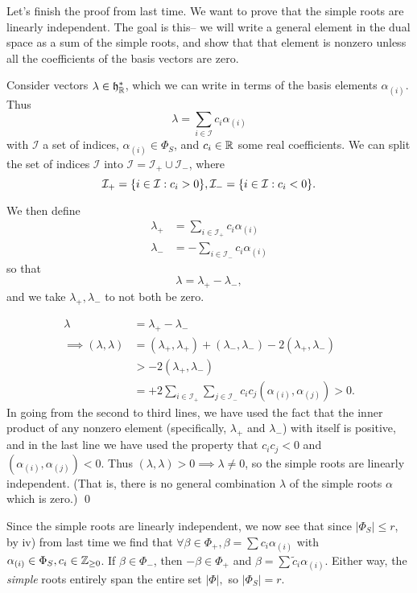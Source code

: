 Let's finish the proof from last time.
We want to prove that the simple roots are linearly independent. The goal is this-- we will write a general element in the dual space as a sum of the simple roots, and show that that element is nonzero unless all the coefficients of the basis vectors are zero.

Consider vectors $\lambda\in \mathfrak{h}^*_{\mathbb{R}}$, which we can write in terms of the basis elements $\alpha_{(i)}$. Thus
$$\lambda=\sum_{i\in \mathcal{I}} c_i \alpha_{(i)}$$
with $\mathcal{I}$ a set of indices, $\alpha_{(i)}\in \Phi_S$, and $c_i\in \mathbb{R}$ some real coefficients. We can split the set of indices $\mathcal{I}$ into $\mathcal{I}=\mathcal{I}_+ \cup \mathcal{I}_-$, where
$$\mathcal{I}_+=\{i\in \mathcal{I}: c_i >0\},\mathcal{I}_-=\{i\in \mathcal{I}: c_i <0\}.$$

We then define
\begin{align*}
    \lambda_+ &= \sum_{i\in \mathcal{I}_+} c_i \alpha_{(i)}\\
    \lambda_- &= -\sum_{i\in \mathcal{I}_-} c_i \alpha_{(i)}
\end{align*}
so that
$$\lambda=\lambda_+-\lambda_-,$$
and we take $\lambda_+,\lambda_-$ to not both be zero.

\begin{align*}
    \lambda&=\lambda_+-\lambda_-\\
    \implies (\lambda,\lambda)&=(\lambda_+,\lambda_+)+(\lambda_-,\lambda_-)-2(\lambda_+,\lambda_-)\\
    &> -2(\lambda_+,\lambda_-)\\
    &=+2 \sum_{i\in \mathcal{I}_+} \sum_{j\in \mathcal{I}_-} c_i c_j (\alpha_{(i)},\alpha_{(j)}) >0.
\end{align*}
In going from the second to third lines, we have used the fact that the inner product of any nonzero element (specifically, $\lambda_+$ and $\lambda_-$) with itself is positive, and in the last line we have used the property that $c_ic_j <0$ and $(\alpha_{(i)},\alpha_{(j)})<0$. Thus $(\lambda,\lambda)>0 \implies \lambda\neq 0$, so the simple roots are linearly independent. (That is, there is no general combination $\lambda$ of the simple roots $\alpha$ which is zero.) \qed

Since the simple roots are linearly independent, we now see that since $|\Phi_S|\leq r$, by iv) from last time we find that $\forall \beta \in \Phi_+,\beta=\sum c_i \alpha_{(i)}$ with $\alpha_{(i)} \in \Phi_S, c_i \in \mathbb{Z}_{\geq 0}$. If $\beta \in \Phi_-$, then $-\beta \in \Phi_+$ and $\beta=\sum \tilde c_i \alpha_{(i)}.$ Either way, the \emph{simple} roots entirely span the entire set $|\Phi|,$ so $|\Phi_S|=r$.

